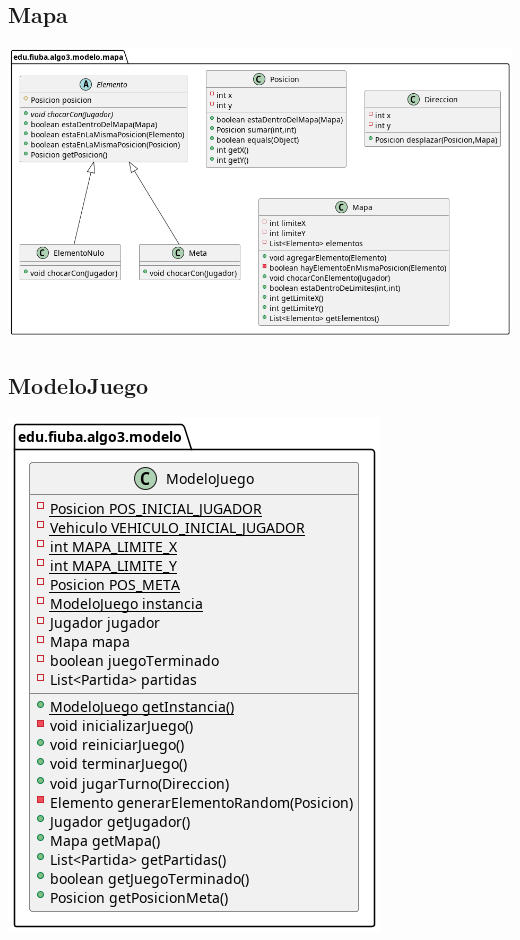 \documentclass[titlepage,a4paper]{article}
\begin{document}
\subsection{Mapa}
\label{sec:org4253e49}

\begin{center}
\includegraphics[width=.9\linewidth]{./diagramas/clases-mapa.png}
\end{center}

\subsection{ModeloJuego}
\label{sec:orgfb5cb6a}

\begin{center}
\includegraphics[width=.9\linewidth]{./diagramas/clases-modelojuego.png}
\end{center}
\end{document}
